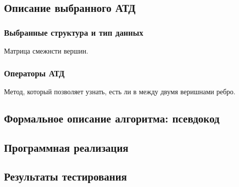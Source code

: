 \subsection{Описание выбранного АТД}
\subsubsection{Выбранные структура и тип данных}
Матрица смежнсти вершин.
\subsubsection{Операторы АТД}
Метод, который позволяет узнать, есть ли в между двумя веришнами ребро.

\subsection{Формальное описание алгоритма: псевдокод}
\begin{algorithmic}[1]
\EndProcedure
\end{algorithmic}

\subsection{Программная реализация}


\subsection{Результаты тестирования}



